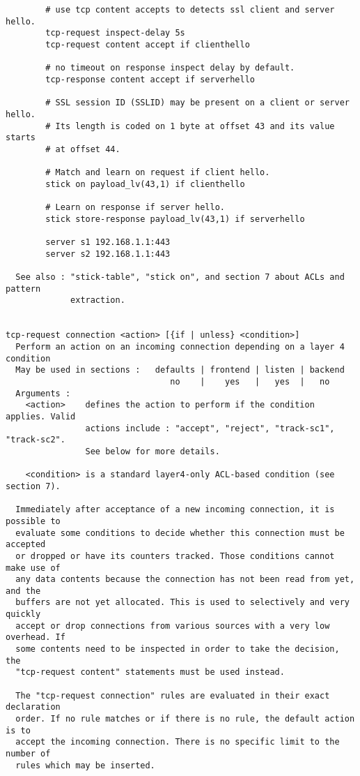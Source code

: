 \begin{verbatim}
        # use tcp content accepts to detects ssl client and server hello.
        tcp-request inspect-delay 5s
        tcp-request content accept if clienthello

        # no timeout on response inspect delay by default.
        tcp-response content accept if serverhello
 
        # SSL session ID (SSLID) may be present on a client or server hello.
        # Its length is coded on 1 byte at offset 43 and its value starts
        # at offset 44.

        # Match and learn on request if client hello.
        stick on payload_lv(43,1) if clienthello

        # Learn on response if server hello.
        stick store-response payload_lv(43,1) if serverhello
	
        server s1 192.168.1.1:443
        server s2 192.168.1.1:443

  See also : "stick-table", "stick on", and section 7 about ACLs and pattern
             extraction.


tcp-request connection <action> [{if | unless} <condition>]
  Perform an action on an incoming connection depending on a layer 4 condition
  May be used in sections :   defaults | frontend | listen | backend
                                 no    |    yes   |   yes  |   no
  Arguments :
    <action>    defines the action to perform if the condition applies. Valid
                actions include : "accept", "reject", "track-sc1", "track-sc2".
                See below for more details.

    <condition> is a standard layer4-only ACL-based condition (see section 7).

  Immediately after acceptance of a new incoming connection, it is possible to
  evaluate some conditions to decide whether this connection must be accepted
  or dropped or have its counters tracked. Those conditions cannot make use of
  any data contents because the connection has not been read from yet, and the
  buffers are not yet allocated. This is used to selectively and very quickly
  accept or drop connections from various sources with a very low overhead. If
  some contents need to be inspected in order to take the decision, the
  "tcp-request content" statements must be used instead.

  The "tcp-request connection" rules are evaluated in their exact declaration
  order. If no rule matches or if there is no rule, the default action is to
  accept the incoming connection. There is no specific limit to the number of
  rules which may be inserted.


\end{verbatim}
